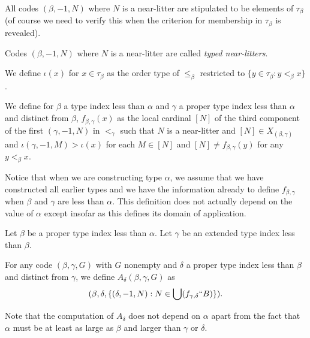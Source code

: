 \begin{lemma}
\label {lem:near-litter-code}
All codes $(\beta,-1,N)$ where $N$ is a near-litter are stipulated to be elements of $\tau_\beta$ (of course we need to verify this when the criterion for membership in $\tau_\beta$ is revealed).
\end{lemma}

\begin{definition}
\label {def:typed-near-litter}
Codes $(\beta,-1,N)$ where $N$ is a near-litter are called {\em typed near-litters\/}.
\end{definition}

\begin{definition}
\label {def:iota}
We define $\iota(x)$ for $x \in \tau_\beta$ as the order type of $\leq_\beta$ restricted to $\{y \in \tau_\beta:y <_\beta x\}$.
\end{definition}

\begin{definition}
\label {def:fmap}
We define for $\beta$ a type index less than $\alpha$ and $\gamma$ a proper type index less than $\alpha$ and distinct from $\beta$,   $f_{\beta,\gamma}(x)$ as the local cardinal $[N]$ of the third component of the first $(\gamma,-1,N)$ in $<_\gamma$ such that $N$ is a near-litter and $[N] \in X_{(\beta,\gamma)}$ and $\iota(\gamma,-1,M)>\iota(x)$ for each $M \in [N]$ and $[N] \neq f_{\beta,\gamma}(y)$ for any $y <_\beta x$.
\end{definition}

Notice that when we are constructing type $\alpha$, we assume that we have constructed all earlier types and we have the information already to define $f_{\beta,\gamma}$ when $\beta$ and $\gamma$ are less than $\alpha$.   This definition does not actually depend on the value of $\alpha$ except insofar as this defines its domain of application.

\begin{definition}
\label {def:alt-ext}
Let $\beta$ be a proper type index less than $\alpha$.  Let $\gamma$ be an extended type index less than $\beta$.

For any code $(\beta,\gamma,G)$ with $G$ nonempty and $\delta$ a proper type index less than $\beta$ and distinct from $\gamma$, we define
$A_\delta(\beta,\gamma,G)$ as $$(\beta,\delta,\{(\delta,-1,N):N \in \bigcup (f_{\gamma,\delta}``B)\}).$$

Note that the computation of $A_\delta$ does not depend on $\alpha$ apart from the fact that $\alpha$ must be at least as large as $\beta$ and larger than $\gamma$ or $\delta$.
\end{definition}

